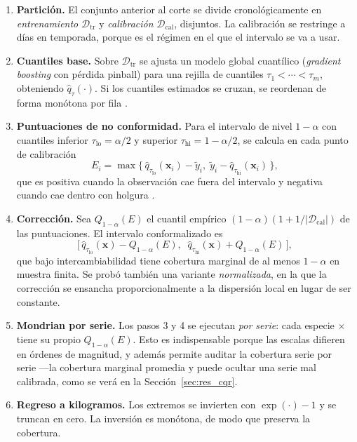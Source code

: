 \begin{enumerate}
  \item \textbf{Partición.} El conjunto anterior al corte se divide cronológicamente en
  \emph{entrenamiento} $\mathcal{D}_{\text{tr}}$ y \emph{calibración}
  $\mathcal{D}_{\text{cal}}$, disjuntos. La calibración se restringe a días en temporada,
  porque es el régimen en el que el intervalo se va a usar.

  \item \textbf{Cuantiles base.} Sobre $\mathcal{D}_{\text{tr}}$ se ajusta un modelo global
  cuantílico (\emph{gradient boosting} con pérdida pinball) para una rejilla de cuantiles
  $\tau_1 < \cdots < \tau_m$, obteniendo $\hat{q}_{\tau}(\cdot)$. Si los cuantiles estimados se
  cruzan, se reordenan de forma monótona por fila \citep{chernozhukov2010}.

  \item \textbf{Puntuaciones de no conformidad.} Para el intervalo de nivel $1-\alpha$ con
  cuantiles inferior $\tau_{\text{lo}} = \alpha/2$ y superior $\tau_{\text{hi}} = 1-\alpha/2$,
  se calcula en cada punto de calibración
  \begin{equation}
    E_i = \max\big\{\, \hat{q}_{\tau_{\text{lo}}}(\mathbf{x}_i) - \tilde{y}_i,\;
                       \tilde{y}_i - \hat{q}_{\tau_{\text{hi}}}(\mathbf{x}_i) \,\big\},
    \label{eq:cqr_score}
  \end{equation}
  que es positiva cuando la observación cae fuera del intervalo y negativa cuando cae dentro
  con holgura \citep{romano2019}.

  \item \textbf{Corrección.} Sea $Q_{1-\alpha}(E)$ el cuantil empírico $(1-\alpha)(1+1/|
  \mathcal{D}_{\text{cal}}|)$ de las puntuaciones. El intervalo conformalizado es
  \begin{equation}
    \Big[\, \hat{q}_{\tau_{\text{lo}}}(\mathbf{x}) - Q_{1-\alpha}(E),\;\;
            \hat{q}_{\tau_{\text{hi}}}(\mathbf{x}) + Q_{1-\alpha}(E) \,\Big],
  \end{equation}
  que bajo intercambiabilidad tiene cobertura marginal de al menos $1-\alpha$ en muestra
  finita. Se probó también una variante \emph{normalizada}, en la que la corrección se ensancha
  proporcionalmente a la dispersión local en lugar de ser constante.

  \item \textbf{Mondrian por serie.} Los pasos 3 y 4 se ejecutan \emph{por serie}: cada
  especie $\times$ \ue{} tiene su propio $Q_{1-\alpha}(E)$. Esto es indispensable porque las
  escalas difieren en órdenes de magnitud, y además permite auditar la cobertura serie por
  serie ---la cobertura marginal promedia y puede ocultar una serie mal calibrada, como se verá
  en la Sección~\ref{sec:res_cqr}.

  \item \textbf{Regreso a kilogramos.} Los extremos se invierten con $\exp(\cdot)-1$ y se
  truncan en cero. La inversión es monótona, de modo que preserva la cobertura.
\end{enumerate}

